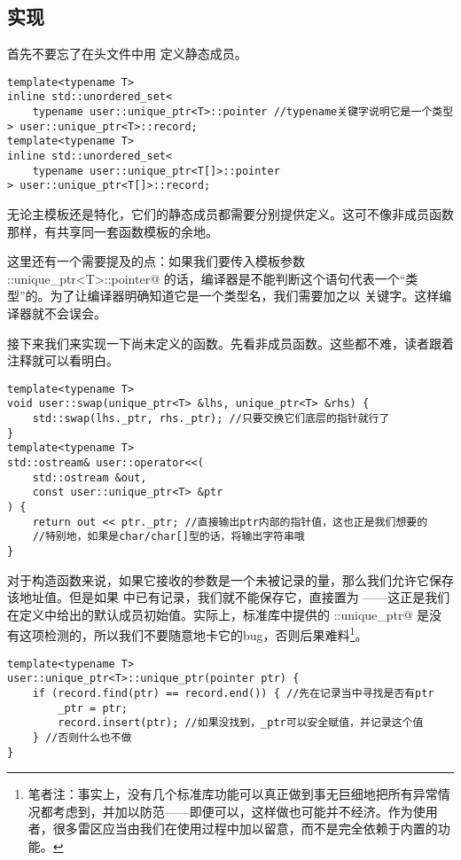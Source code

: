\subsection*{实现}
首先不要忘了在头文件中用 \lstinline@inline@ 定义静态成员。
\begin{lstlisting}
template<typename T>
inline std::unordered_set<
    typename user::unique_ptr<T>::pointer //typename关键字说明它是一个类型
> user::unique_ptr<T>::record;
template<typename T>
inline std::unordered_set<
    typename user::unique_ptr<T[]>::pointer
> user::unique_ptr<T[]>::record;
\end{lstlisting}
无论主模板还是特化，它们的静态成员都需要分别提供定义。这可不像非成员函数那样，有共享同一套函数模板的余地。\par
这里还有一个需要提及的点：如果我们要传入模板参数 \lstinline@user::unique_ptr<T>::pointer@ 的话，编译器是不能判断这个语句代表一个``类型''的。为了让编译器明确知道它是一个类型名，我们需要加之以 \lstinline@typename@ 关键字。这样编译器就不会误会。\par
接下来我们来实现一下尚未定义的函数。先看非成员函数。这些都不难，读者跟着注释就可以看明白。
\begin{lstlisting}
template<typename T>
void user::swap(unique_ptr<T> &lhs, unique_ptr<T> &rhs) {
    std::swap(lhs._ptr, rhs._ptr); //只要交换它们底层的指针就行了
}
template<typename T>
std::ostream& user::operator<<(
    std::ostream &out,
    const user::unique_ptr<T> &ptr
) {
    return out << ptr._ptr; //直接输出ptr内部的指针值，这也正是我们想要的
    //特别地，如果是char/char[]型的话，将输出字符串哦
}
\end{lstlisting}
对于构造函数来说，如果它接收的参数是一个未被记录的量，那么我们允许它保存该地址值。但是如果 \lstinline@record@ 中已有记录，我们就不能保存它，直接置为 ——这正是我们在定义中给出的默认成员初始值。实际上，标准库中提供的 \lstinline@std::unique_ptr@ 是没有这项检测的，所以我们不要随意地卡它的bug，否则后果难料\footnote{笔者注：事实上，没有几个标准库功能可以真正做到事无巨细地把所有异常情况都考虑到，并加以防范——即便可以，这样做也可能并不经济。作为使用者，很多雷区应当由我们在使用过程中加以留意，而不是完全依赖于内置的功能。}。
\begin{lstlisting}
template<typename T>
user::unique_ptr<T>::unique_ptr(pointer ptr) {
    if (record.find(ptr) == record.end()) { //先在记录当中寻找是否有ptr
        _ptr = ptr;
        record.insert(ptr); //如果没找到，_ptr可以安全赋值，并记录这个值
    } //否则什么也不做
}
\end{lstlisting}\par
